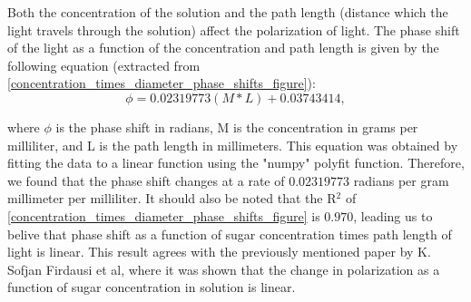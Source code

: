 

Both the concentration of the solution and the path length (distance which the light travels through the solution) affect the polarization of light. The phase shift of the light as a function of the concentration and path length is given by the following equation (extracted from \cref{concentration_times_diameter_phase_shifts_figure}):
\begin{equation}
\phi = 0.02319773(M*L) + 0.03743414,
\end{equation}

where $\phi$ is the phase shift in radians, M is the concentration in grams per milliliter, and L is the path length in millimeters. This equation was obtained by fitting the data to a linear function using the "numpy" polyfit function. Therefore, we found that the phase shift changes at a rate of $0.02319773$ radians per gram millimeter per milliliter. It should also be noted that the R$^2$ of \cref{concentration_times_diameter_phase_shifts_figure} is $0.970$, leading us to belive that phase shift as a function of sugar concentration times path length of light is linear. This result agrees with the previously mentioned paper by K. Sofjan Firdausi et al, where it was shown that the change in polarization as a function of sugar concentration in solution is linear\cite{Firsdausi2018}.

